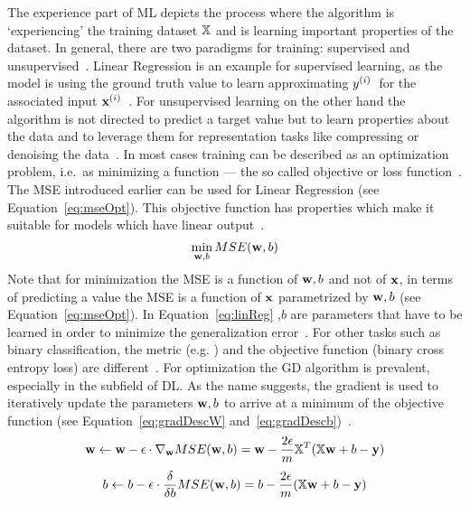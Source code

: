 The experience part of \ac{ML} depicts the process where the algorithm is `experiencing' the training
dataset $\mathbb{X}$ and is learning important properties of the dataset.
In general, there are two paradigms for training: supervised and
unsupervised~\citep{goodfellow_deep_2016}.
Linear Regression is an example for supervised learning, as the model is using the ground truth value
to learn approximating $y^{(i)}$\ for the associated input
$\textbf{x}^{(i)}$~\citep{alzubi_machine_2018,goodfellow_deep_2016}.
For unsupervised learning on the other hand the algorithm is not directed to predict a target
value but to learn properties about the data and to leverage them for representation tasks
like compressing or denoising the data~\citep{goodfellow_deep_2016,geron_hands-machine_2017}.
In most cases training can be described as an optimization problem, i.e.\ as minimizing a
function --- the so called objective or loss function~\citep{goodfellow_deep_2016}.
The MSE introduced earlier can be used for Linear Regression (see Equation~\ref{eq:mseOpt}).
This objective function has properties which make it suitable for models which have linear
output~\citep{goodfellow_deep_2016}. %
\begin{equation}\label{eq:mseOpt}
    \min_{\textbf{w},b} MSE(\textbf{w},b)
\end{equation}
Note that for minimization the MSE is a function of $\textbf{w},b$ and not of $\textbf{x}$, in terms of
predicting a value the MSE is a function of $\textbf{x}$ parametrized by $\textbf{w},b$ (see Equation~\ref{eq:mseOpt}).
In Equation~\ref{eq:linReg} \w,$b$ are parameters that have to be learned in order to minimize
the generalization error~\citep{james_introduction_2013,geron_hands-machine_2017}.
For other tasks such as binary classification, the metric (e.g. \fone) and the
objective function (binary cross entropy loss) are different~\citep{geron_hands-machine_2017,
ho_real-world-weight_2020}.
For optimization the \ac{GD} algorithm is prevalent, especially in the subfield of \ac{DL}.
As the name suggests, the gradient is used to iteratively update the parameters $\textbf{w},b$ to arrive
at a minimum of the objective function (see Equation~\ref{eq:gradDescW}
and~\ref{eq:gradDescb})~\citep{geron_hands-machine_2017}.
\begin{equation}\label{eq:gradDescW}
    \textbf{w} \leftarrow \textbf{w} - \epsilon \cdot \nabla_{\textbf{w}} MSE(\textbf{w},b) = \textbf{w}-\frac{2\epsilon}{m}\mathbb{X}^T (\mathbb{X}\textbf{w}+b-\textbf{y})
\end{equation}
\begin{equation}\label{eq:gradDescb}
    b \leftarrow b - \epsilon \cdot \frac{\delta}{\delta b} MSE(\textbf{w},b) = b-\frac{2\epsilon}{m}(\mathbb{X}\textbf{w}+b-\textbf{y})
\end{equation}
